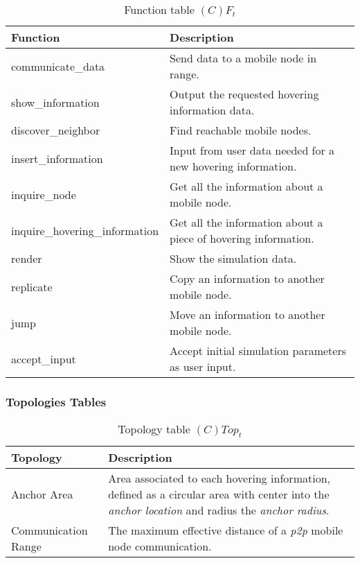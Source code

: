 \begin{table}[H]
	\centering
	\begin{tabular}{|p{5cm}|p{7cm}|}
			\hline
			\textbf{Function} & \textbf{Description} \\
			\hline
			communicate\_data & Send data to a mobile node in range.\\
			\hline
			show\_information & Output the requested hovering information data.\\
			\hline
			discover\_neighbor & Find reachable mobile nodes.\\
			\hline
			insert\_information & Input from user data needed for a new hovering
			information.\\
			\hline
			inquire\_node & Get all the information about a mobile node.\\
			\hline
			inquire\_hovering\_information & Get all the information about a piece of
			hovering information. \\
			\hline
			render & Show the simulation data. \\
			\hline
			replicate & Copy an information to another mobile node. \\
			\hline
			jump & Move an information to another mobile node. \\
			\hline
			accept\_input & Accept initial simulation parameters as user input. \\
			\hline
		\end{tabular}
	\caption{Function table $(C)F_t$}
	\label{tab:cft}
\end{table}

\subsubsection{Topologies Tables}

\begin{table}[H]
	\centering
	\begin{tabular}{|p{4cm}|p{8cm}|}
			\hline
			\textbf{Topology} & \textbf{Description} \\
			\hline
			Anchor Area & Area associated to each hovering information, defined as a
			circular area with center into the \emph{anchor location} and radius the
			\emph{anchor radius}.\\
			\hline
			Communication Range & The maximum effective distance of a \emph{p2p}
			mobile node communication. \\
			\hline
		\end{tabular}
	\caption{Topology table $(C)Top_t$}
	\label{tab:ctopt}
\end{table}

